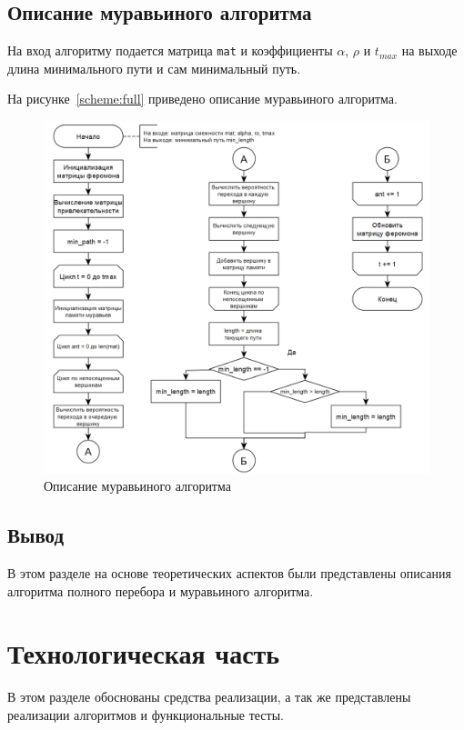 \documentclass[a4paper, 12pt]{extreport}
\begin{document}
\section{Описание муравьиного алгоритма}

На вход алгоритму подается матрица \texttt{mat} и коэффициенты $\alpha$, $\rho$ и $t_{max}$ на выходе длина минимального 
пути и сам минимальный путь.

На рисунке~\ref{scheme:full} приведено описание муравьиного алгоритма.

\begin{figure}[h]
	\centering
	\includegraphics[scale=0.7]{tools/ant.png}
	\caption{Описание муравьиного алгоритма}
	\label{scheme:ant}
\end{figure}

\section{Вывод}
В этом разделе на основе теоретических аспектов были представлены описания алгоритма полного перебора и муравьиного
алгоритма.

\chapter{Технологическая часть}

В этом разделе обоснованы средства реализации, а так же представлены реализации алгоритмов и функциональные тесты.
\end{document}
